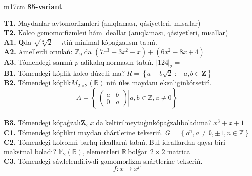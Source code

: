 \documentclass{article}
\begin{document}
\begin{tabular}{m{17cm}}
\textbf{85-variant}
\newline

\textbf{T1.} Maydanlar avtomorfizmleri (anıqlaması, qásiyetleri, mısallar) \\
\textbf{T2.} Kolco gomomorfizmleri hám ideallar (anıqlaması, qásiyetleri, mısallar) \\
\textbf{A1.} \(\mathbf{Q}\)da \(\sqrt{\sqrt[3]{2} - i}\)tiń minimal kópaǵzalısın tabıń. \\
\textbf{A2.} Ámellerdi orınlań: \(\mathbb{Z}_{9}\) da \(\left( 7x^{3} + 3x^{2} - x \right) + \left( 6x^{2} - 8x + 4 \right)\) \\
\textbf{A3.} Tómendegi sannıń \(p\)-adikalıq normasın tabıń. \(|124|_{2} =\) \\
\textbf{B1.} Tómendegi kóplik kolco dúzedi ma? \(R = \left\{ a + b\sqrt{2}\ :\ \ \ \ a,b \in \mathbf{Z} \right\}\) \\
\textbf{B2.} Tómendegi kóplik\(M_{2 \times 2}\left( \mathbb{R} \right)\) niń úles maydanı ekenliginkórsetiń.
\[A = \left\{ \left. \ \begin{pmatrix}
a & b \\
0 & a
\end{pmatrix} \right|a,b\mathbb{\in Z},a \neq 0 \right\}\] \\
\textbf{B3.} Tómendegi kópaǵzalı\(\mathbf{Z}_{2}\lbrack x\rbrack\)da keltirilmeytuǵınkópaǵzalıboladıma? \(x^{3} + x + 1\) \\
\textbf{C1.} Tómendegi kóplikti maydan shártlerine tekseriń. \(G = \left\{ a^{n},a \neq 0, \pm 1,n \in \mathbb{Z} \right\}\) \\
\textbf{C2.} Tómendegi kolconıń barlıq ideallarıń tabıń. Bul ideallardan qaysı-biri maksimal boladı? \(\mathbb{M}_{2}\left( \mathbb{R} \right)\), elementleri \(\mathbb{R}\) bolǵan \(2 \times 2\) matrica \\
\textbf{C3.} Tómendegi sáwlelendiriwdi gomomorfizm shártlerine tekseriń.
\[f:x \rightarrow x^{p}\] \\

\end{tabular}
\vspace{1cm}
\end{document}

